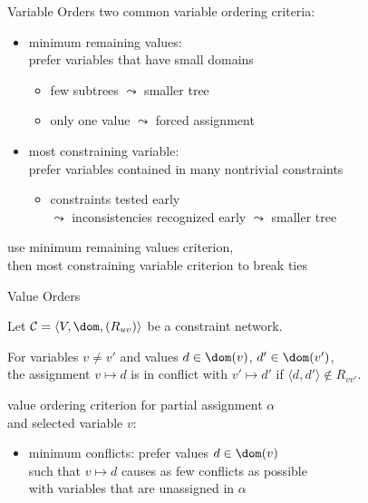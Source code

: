 \begin{frame}{Variable Orders}
  two common variable ordering criteria:
  \begin{itemize}
    \item \alert{minimum remaining values:}\\
      prefer variables that have small \alert{domains}
    \begin{itemize}
      \item {} few subtrees $\leadsto$ smaller tree
      \item {} only \alert{one} value $\leadsto$
      forced assignment
    \end{itemize}
    \item \alert{most constraining variable:} \\
      prefer variables contained in \alert{many}
      nontrivial constraints
    \begin{itemize}
      \item {} constraints tested early \\
      $\leadsto$ inconsistencies recognized early $\leadsto$ smaller
      tree
    \end{itemize}
  \end{itemize}

   use minimum remaining values criterion, \\
  then most constraining variable criterion to break ties
\end{frame}

\begin{frame}{Value Orders}
  \begin{definition}[conflict]
    Let $\mathcal C = \langle V, \dom, (R_{uv})\rangle$ be a
    constraint network.

    For variables $v \neq v'$ and values $d \in \dom(v)$, $d' \in
    \dom(v')$, \\ the assignment $v \mapsto d$ is \alert{in conflict}
    with $v' \mapsto d'$ if $\langle d, d'\rangle \notin R_{vv'}$.
  \end{definition}

  \medskip

  value ordering criterion for partial assignment $\alpha$ \\ and
  selected variable $v$:
  \begin{itemize}
  \item \alert{minimum conflicts:} prefer values $d \in \dom(v)$
    \\ such that $v \mapsto d$ causes as few conflicts as possible \\
    with variables that are unassigned in $\alpha$
  \end{itemize}
\end{frame}

